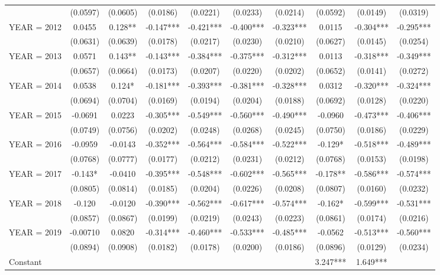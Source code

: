 \begin{tabular}{lccccccccc}
 & (0.0597) & (0.0605) & (0.0186) & (0.0221) & (0.0233) & (0.0214) & (0.0592) & (0.0149) & (0.0319) \\
YEAR = 2012 & 0.0455 & 0.128** & -0.147*** & -0.421*** & -0.400*** & -0.323*** & 0.0115 & -0.304*** & -0.295*** \\
 & (0.0631) & (0.0639) & (0.0178) & (0.0217) & (0.0230) & (0.0210) & (0.0627) & (0.0145) & (0.0254) \\
YEAR = 2013 & 0.0571 & 0.143** & -0.143*** & -0.384*** & -0.375*** & -0.312*** & 0.0113 & -0.318*** & -0.349*** \\
 & (0.0657) & (0.0664) & (0.0173) & (0.0207) & (0.0220) & (0.0202) & (0.0652) & (0.0141) & (0.0272) \\
YEAR = 2014 & 0.0538 & 0.124* & -0.181*** & -0.393*** & -0.381*** & -0.328*** & 0.0312 & -0.320*** & -0.324*** \\
 & (0.0694) & (0.0704) & (0.0169) & (0.0194) & (0.0204) & (0.0188) & (0.0692) & (0.0128) & (0.0220) \\
YEAR = 2015 & -0.0691 & 0.0223 & -0.305*** & -0.549*** & -0.560*** & -0.490*** & -0.0960 & -0.473*** & -0.406*** \\
 & (0.0749) & (0.0756) & (0.0202) & (0.0248) & (0.0268) & (0.0245) & (0.0750) & (0.0186) & (0.0229) \\
YEAR = 2016 & -0.0959 & -0.0143 & -0.352*** & -0.564*** & -0.584*** & -0.522*** & -0.129* & -0.518*** & -0.489*** \\
 & (0.0768) & (0.0777) & (0.0177) & (0.0212) & (0.0231) & (0.0212) & (0.0768) & (0.0153) & (0.0198) \\
YEAR = 2017 & -0.143* & -0.0410 & -0.395*** & -0.548*** & -0.602*** & -0.565*** & -0.178** & -0.586*** & -0.574*** \\
 & (0.0805) & (0.0814) & (0.0185) & (0.0204) & (0.0226) & (0.0208) & (0.0807) & (0.0160) & (0.0232) \\
YEAR = 2018 & -0.120 & -0.0120 & -0.390*** & -0.562*** & -0.617*** & -0.574*** & -0.162* & -0.599*** & -0.531*** \\
 & (0.0857) & (0.0867) & (0.0199) & (0.0219) & (0.0243) & (0.0223) & (0.0861) & (0.0174) & (0.0216) \\
YEAR = 2019 & -0.00710 & 0.0820 & -0.314*** & -0.460*** & -0.533*** & -0.485*** & -0.0562 & -0.513*** & -0.560*** \\
 & (0.0894) & (0.0908) & (0.0182) & (0.0178) & (0.0200) & (0.0186) & (0.0896) & (0.0129) & (0.0234) \\
Constant &  &  &  &  &  &  & 3.247*** & 1.649*** &  \\

\end{tabular}
